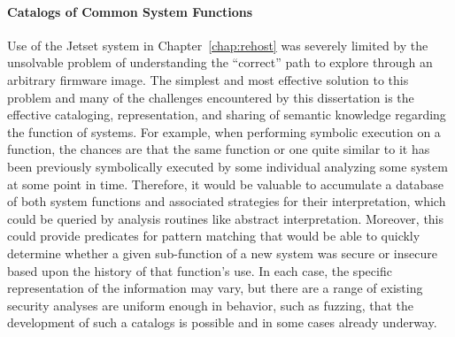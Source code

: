 \paragraph{Catalogs of Common System Functions}
Use of the Jetset system in Chapter~\ref{chap:rehost} was severely limited by the unsolvable problem of understanding the ``correct'' path to explore through an arbitrary firmware image.
The simplest and most effective solution to this problem and many of the challenges encountered by this dissertation is the effective cataloging, representation, and sharing of semantic knowledge regarding the function of systems.
For example, when performing symbolic execution on a function, the chances are that the same function or one quite similar to it has been previously symbolically executed by some individual analyzing some system at some point in time.
Therefore, it would be valuable to accumulate a database of both system functions and associated strategies for their interpretation, which could be queried by analysis routines like abstract interpretation.
Moreover, this could provide predicates for pattern matching that would be able to quickly determine whether a given sub-function of a new system was secure or insecure based upon the history of that function's use.
In each case, the specific representation of the information may vary, but there are a range of existing security analyses are uniform enough in behavior, such as fuzzing, that the development of such a catalogs is possible and in some cases already underway.
